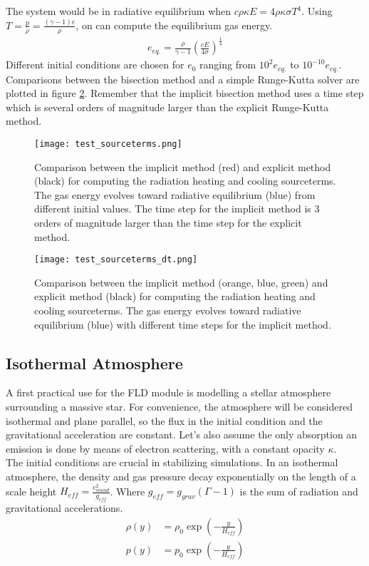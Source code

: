 The system would be in radiative equilibrium when $c \rho \kappa E = 4 \rho \kappa \sigma T^4$. Using $T =  \frac{p}{\rho}= \frac{(\gamma - 1)e}{\rho}$, on can compute the equilibrium gas energy.
\begin{align}
e_{eq.} = \frac{\rho}{\gamma - 1} \left( \frac{c E}{4 \sigma} \right)^\frac{1}{4}
\end{align}
Different initial conditions are chosen for $e_0$ ranging from $10^2 e_{eq.}$ to $10^{-10} e_{eq.}$. Comparisons between the bisection method and a simple Runge-Kutta solver are plotted in figure \ref{fig: test_sourceterms}. Remember that the implicit bisection method uses a time step which is several orders of magnitude larger than the explicit Runge-Kutta method.

\begin{figure}
\texttt{[image: test\_sourceterms.png]}
\label{fig: test_sourceterms}
\caption{Comparison between the implicit method (red) and explicit method (black) for computing the radiation heating and cooling sourceterms. The gas energy evolves toward radiative equilibrium (blue) from different initial values. The time step for the implicit method is 3 orders of magnitude larger than the time step for the explicit method.}
\end{figure}

\begin{figure}
\texttt{[image: test\_sourceterms\_dt.png]}
\label{fig: test_sourceterms}
\caption{Comparison between the implicit method (orange, blue, green) and explicit method (black) for computing the radiation heating and cooling sourceterms. The gas energy evolves toward radiative equilibrium (blue) with different time steps for the implicit method.}
\end{figure}

\subsection{Isothermal Atmosphere}
A first practical use for the FLD module is modelling a stellar atmosphere surrounding a massive star. For convenience, the atmosphere will be considered isothermal and plane parallel, so the flux in the initial condition and the gravitational acceleration are constant. Let's also assume the only absorption an emission is done by means of electron scattering, with a constant opacity $\kappa$.\\

The initial conditions are crucial in stabilizing simulations. In an isothermal atmosphere, the density and gas pressure decay exponentially on the length of a scale height $H_{eff} = \frac{c_{sound}^2}{g_{eff}}$. Where $g_{eff} = g_{grav}(\Gamma - 1)$ is the sum of radiation and gravitational accelerations. 
\begin{align}
\rho(y) &= \rho_0 \exp \left( -\frac{y}{H_{eff}} \right) \\
 p(y)   &= p_0    \exp \left( -\frac{y}{H_{eff}} \right)
\end{align}

